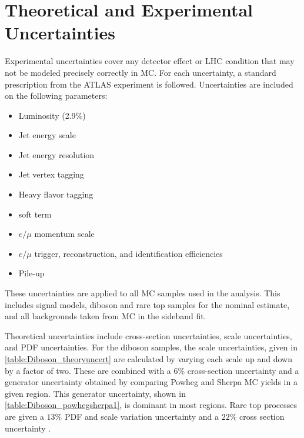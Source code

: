
\section{Theoretical and Experimental Uncertainties}

Experimental uncertainties cover any detector effect or \ac{LHC} condition that may not be modeled precisely correctly in \ac{MC}. For each uncertainty, a standard prescription from the \ac{ATLAS} experiment is followed. Uncertainties are included on the following parameters:  
\begin{itemize}
\item Luminosity (2.9\%) \cite{2011lumi,2012lumi}
\item Jet energy scale \cite{ATL-PHYS-PUB-2015-015}
\item Jet energy resolution \cite{ATL-PHYS-PUB-2015-015}
\item Jet vertex tagging
\item Heavy flavor tagging
\item \met soft term \cite{ATL-PHYS-PUB-2015-023}
\item $e/\mu$ momentum scale  
\item $e/\mu$ trigger, reconstruction, and identification efficiencies
\item Pile-up
\end{itemize}

These uncertainties are applied to all \ac{MC} samples used in the analysis. This includes signal models, diboson and rare top samples for the nominal estimate, and all backgrounds taken from \ac{MC} in the sideband fit. 

Theoretical uncertainties include cross-section uncertainties, scale uncertainties, and \ac{PDF} uncertainties. For the diboson samples, the scale uncertainties, given in \autoref{table:Diboson_theoryuncert} are calculated by varying each scale up and down by a factor of two. These are combined with a 6\% cross-section uncertainty and a generator uncertainty obtained by comparing {\sc Powheg} and {\sc Sherpa} \ac{MC} yields in a given region. This generator uncertainty, shown in \autoref{table:Diboson_powhegsherpa1}, is dominant in most regions. Rare top processes are given a $13\%$ PDF and scale variation uncertainty \cite{Alwall:2014hca} and a $22\%$ cross section uncertainty \cite{Campbell:2012,Lazopoulos:2008,Garzelli:2012bn}. 

